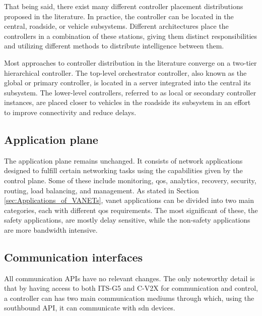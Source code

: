 That being said, there exist many different controller placement distributions proposed in the literature. In practice, the controller can be located in the central, roadside, or vehicle subsystems. Different architectures place the controllers in a combination of these stations, giving them distinct responsibilities and utilizing different methods to distribute intelligence between them.

Most approaches to controller distribution in the literature\cite{bhatia_software_2019}\cite{cardona_software-defined_2020}\cite{toufga_openflow_2018} converge on a two-tier hierarchical controller. The top-level orchestrator controller, also known as the global or primary controller, is located in a server integrated into the central \gls{its} subsystem. The lower-level controllers, referred to as local or secondary controller instances, are placed closer to vehicles in the roadside \gls{its} subsystem in an effort to improve connectivity and reduce delays. 

\subsection{Application plane}

The application plane remains unchanged. It consists of network applications designed to fulfill certain networking tasks using the capabilities given by the control plane. Some of these include monitoring, \gls{qos}, analytics, recovery, security, routing, load balancing, and management\cite{bhatia_software_2019}. As stated in Section \ref{sec:Applications_of_VANETs}, \gls{vanet} applications can be divided into two main categories, each with different \gls{qos} requirements. The most significant of these, the safety applications, are mostly delay sensitive, while the non-safety applications are more bandwidth intensive\cite{smida_efficient_2020}. 


\subsection{Communication interfaces}

All communication APIs have no relevant changes. The only noteworthy detail is that  by having access to both ITS-G5 and C-V2X for communication and control\cite{toufga_openflow_2018}, a controller can has two main communication mediums through which, using the southbound API, it can communicate with \gls{sdn} devices. 





